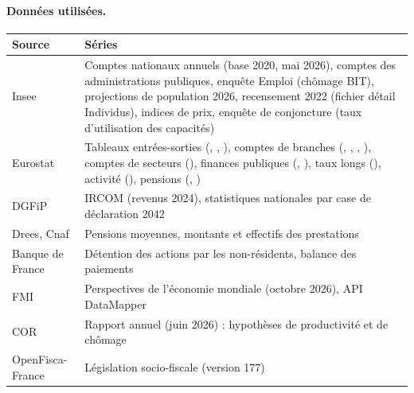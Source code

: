 \paragraph{Données utilisées.}
\begin{small}
\begin{tabularx}{\linewidth}{@{}p{4.2cm}L@{}}
\toprule
Source & Séries \\
\midrule
Insee & Comptes nationaux annuels (base 2020, mai 2026), comptes des administrations publiques, enquête Emploi (chômage BIT),
projections de population 2026, recensement 2022 (fichier détail Individus), indices de prix, enquête de conjoncture
(taux d'utilisation des capacités) \\
Eurostat & Tableaux entrées-sorties (, , ), comptes
de branches (, , , ), comptes de
secteurs (), finances publiques (, ), taux longs
(), activité (), pensions (, ) \\
DGFiP & IRCOM (revenus 2024), statistiques nationales par case de déclaration 2042 \\
Drees, Cnaf & Pensions moyennes, montants et effectifs des prestations \\
Banque de France & Détention des actions par les non-résidents, balance des paiements \\
FMI & Perspectives de l'économie mondiale (octobre 2026), API DataMapper \\
COR & Rapport annuel (juin 2026) : hypothèses de productivité et de chômage \\
OpenFisca-France & Législation socio-fiscale (version 177) \\
\bottomrule
\end{tabularx}
\end{small}
